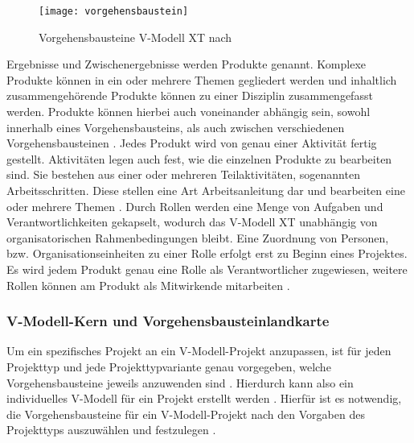 \begin{figure}[htp]
\begin{center}
  \texttt{[image: vorgehensbaustein]} %
  \caption{Vorgehensbausteine V-Modell XT nach \cite{2004vmodell}}
  \label{fig:vorgehensbausteine}
\end{center}
\end{figure}

Ergebnisse und Zwischenergebnisse werden Produkte genannt. Komplexe Produkte können in ein oder mehrere Themen gegliedert werden und inhaltlich zusammengehörende Produkte können zu einer Disziplin zusammengefasst werden. Produkte können hierbei auch voneinander abhängig sein, sowohl innerhalb eines Vorgehensbausteins, als auch zwischen verschiedenen Vorgehensbausteinen \cite{2004vmodell}.\newline
Jedes Produkt wird von genau einer Aktivität fertig gestellt. Aktivitäten legen auch fest, wie die einzelnen Produkte zu bearbeiten sind. Sie bestehen aus einer oder mehreren Teilaktivitäten, sogenannten Arbeitsschritten. Diese stellen eine Art Arbeitsanleitung dar und bearbeiten eine oder mehrere Themen \cite{2004vmodell}.\newline
Durch Rollen werden eine Menge von Aufgaben und Verantwortlichkeiten gekapselt, wodurch das V-Modell XT unabhängig von organisatorischen Rahmenbedingungen bleibt. Eine Zuordnung von Personen, bzw. Organisationseinheiten zu einer Rolle erfolgt erst zu Beginn eines Projektes. Es wird jedem Produkt genau eine Rolle als Verantwortlicher zugewiesen, weitere Rollen können am Produkt als Mitwirkende mitarbeiten \cite{2004vmodell}. \newline



\subsubsection{V-Modell-Kern und Vorgehensbausteinlandkarte}

Um ein spezifisches Projekt an ein V-Modell-Projekt anzupassen, ist für jeden Projekttyp und jede Projekttypvariante genau vorgegeben, welche Vorgehensbausteine jeweils anzuwenden sind \cite{2004vmodell}. Hierdurch kann also ein individuelles V-Modell für ein Projekt erstellt werden \cite{heinrich2007}. Hierfür ist es notwendig, die Vorgehensbausteine für ein V-Modell-Projekt nach den Vorgaben des Projekttyps auszuwählen und festzulegen \cite{2004vmodell}. \newline

